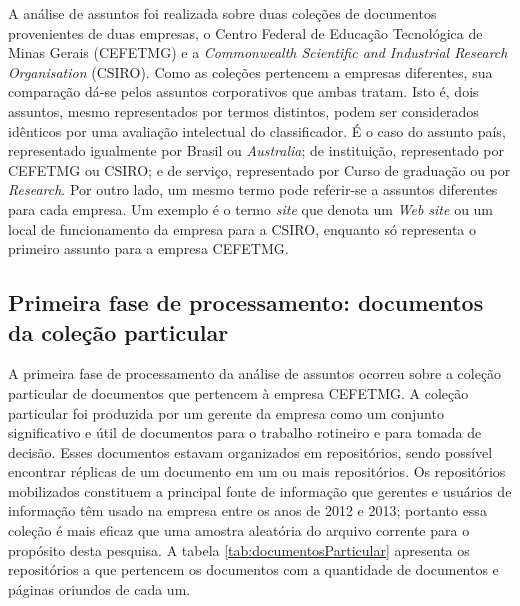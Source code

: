 A análise de assuntos foi realizada sobre duas coleções de documentos provenientes de duas empresas, o Centro Federal de Educação Tecnológica de Minas Gerais (CEFETMG) e a \textit{Commonwealth Scientific and Industrial Research Organisation} (CSIRO). Como as coleções pertencem a empresas diferentes, sua comparação dá-se pelos assuntos corporativos que ambas tratam. Isto é, dois assuntos, mesmo representados por termos distintos, podem ser considerados idênticos por uma avaliação intelectual do classificador. É o caso do assunto país, representado igualmente por Brasil ou \textit{Australia}; de instituição, representado por CEFETMG ou CSIRO; e de serviço, representado por Curso de graduação ou por \textit{Research}. Por outro lado, um mesmo termo pode referir-se a assuntos diferentes para cada empresa. Um exemplo é o termo \textit{site} que denota um \textit{Web site} ou um local de funcionamento da empresa para a CSIRO, enquanto só representa o primeiro assunto para a empresa CEFETMG. 


\subsection{Primeira fase de processamento: documentos da coleção particular}

A primeira fase de processamento da análise de assuntos ocorreu sobre a coleção particular de documentos que pertencem à empresa CEFETMG. A coleção particular foi produzida por um gerente da empresa como um conjunto significativo e útil de documentos para o trabalho rotineiro e para tomada de decisão. Esses documentos estavam organizados em repositórios, sendo possível encontrar réplicas de um documento em um ou mais repositórios. Os repositórios mobilizados constituem a principal fonte de informação que gerentes e usuários de informação têm usado na empresa entre os anos de 2012 e 2013; portanto essa coleção é mais eficaz que uma amostra aleatória do arquivo corrente para o propósito desta pesquisa. A tabela \ref{tab:documentosParticular} apresenta os repositórios a que pertencem os documentos com a quantidade de documentos e páginas oriundos de cada um.

